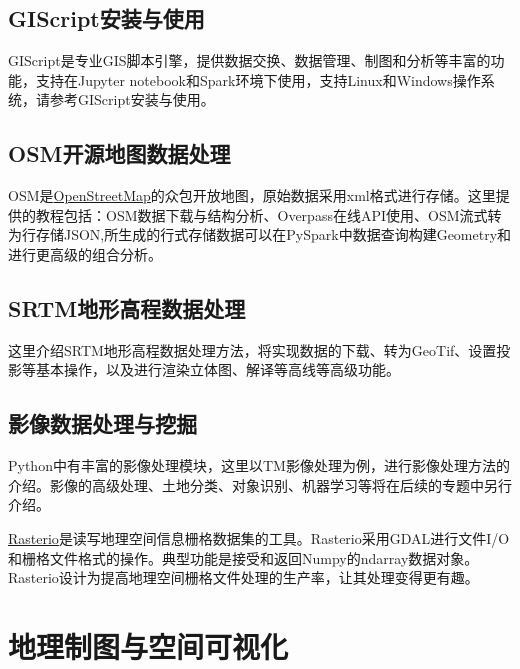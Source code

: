 \documentclass[letterpaper,10pt,english]{sphinxmanual}
\begin{document}
\subsection{GIScript安装与使用}
\label{gispark_process:GIScript_u5b89_u88c5_u4e0e_u4f7f_u7528}
GIScript是专业GIS脚本引擎，提供数据交换、数据管理、制图和分析等丰富的功能，支持在Jupyter
notebook和Spark环境下使用，支持Linux和Windows操作系统，请参考GIScript安装与使用。


\subsection{OSM开源地图数据处理}
\label{gispark_process:OSM_u5f00_u6e90_u5730_u56fe_u6570_u636e_u5904_u7406}
OSM是\href{http://www.openstreetmap.org}{OpenStreetMap}的众包开放地图，原始数据采用xml格式进行存储。这里提供的教程包括：OSM数据下载与结构分析、Overpass在线API使用、OSM流式转为行存储JSON,所生成的行式存储数据可以在PySpark中数据查询构建Geometry和进行更高级的组合分析。


\subsection{SRTM地形高程数据处理}
\label{gispark_process:SRTM_u5730_u5f62_u9ad8_u7a0b_u6570_u636e_u5904_u7406}
这里介绍SRTM地形高程数据处理方法，将实现数据的下载、转为GeoTif、设置投影等基本操作，以及进行渲染立体图、解译等高线等高级功能。


\subsection{影像数据处理与挖掘}
\label{gispark_process:_u5f71_u50cf_u6570_u636e_u5904_u7406_u4e0e_u6316_u6398}
\begin{DUlineblock}{0em}
\item[] Python中有丰富的影像处理模块，这里以TM影像处理为例，进行影像处理方法的介绍。影像的高级处理、土地分类、对象识别、机器学习等将在后续的专题中另行介绍。
\item[] \href{https://github.com/mapbox/rasterio.git}{Rasterio}是读写地理空间信息栅格数据集的工具。Rasterio采用GDAL进行文件I/O和栅格文件格式的操作。典型功能是接受和返回Numpy的ndarray数据对象。Rasterio设计为提高地理空间栅格文件处理的生产率，让其处理变得更有趣。
\end{DUlineblock}


\section{地理制图与空间可视化}
\label{gispark_mapping:_u5730_u7406_u5236_u56fe_u4e0e_u7a7a_u95f4_u53ef_u89c6_u5316}\label{gispark_mapping::doc}
\end{document}

